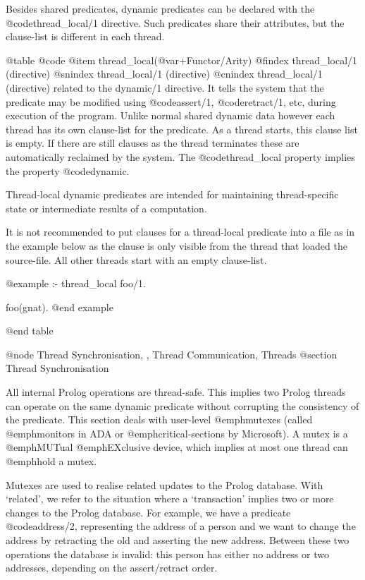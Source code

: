 {{{{{{{{Besides shared predicates, dynamic predicates can be declared with the
@code{thread_local/1} directive. Such predicates share their
attributes, but the clause-list is different in each thread.

@table @code
@item thread_local(@var{+Functor/Arity}) 
@findex thread_local/1 (directive)
@snindex thread_local/1 (directive)
@cnindex thread_local/1 (directive)
related to the dynamic/1 directive.  It tells the system that the
predicate may be modified using @code{assert/1}, @code{retract/1},
etc, during execution of the program.  Unlike normal shared dynamic
data however each thread has its own clause-list for the predicate.
As a thread starts, this clause list is empty.  If there are still
clauses as the thread terminates these are automatically reclaimed by
the system.  The @code{thread_local} property implies
the property @code{dynamic}.

Thread-local dynamic predicates are intended for maintaining
thread-specific state or intermediate results of a computation.

It is not recommended to put clauses for a thread-local predicate into
a file as in the example below as the clause is only visible from the
thread that loaded the source-file.  All other threads start with an
empty clause-list.

@example
:- thread_local
	foo/1.

foo(gnat).
@end example

@end table


@node Thread Synchronisation, , Thread Communication, Threads
@section Thread Synchronisation

All internal Prolog operations are thread-safe. This implies two Prolog
threads can operate on the same dynamic predicate without corrupting the
consistency of the predicate. This section deals with user-level
@emph{mutexes} (called @emph{monitors} in ADA or
@emph{critical-sections} by Microsoft).  A mutex is a
@emph{MUT}ual @emph{EX}clusive device, which implies at most one thread
can @emph{hold} a mutex.

Mutexes are used to realise related updates to the Prolog database.
With `related', we refer to the situation where a `transaction' implies
two or more changes to the Prolog database.  For example, we have a
predicate @code{address/2}, representing the address of a person and we want
to change the address by retracting the old and asserting the new
address.  Between these two operations the database is invalid: this
person has either no address or two addresses, depending on the
assert/retract order.

}}}}}}}}
